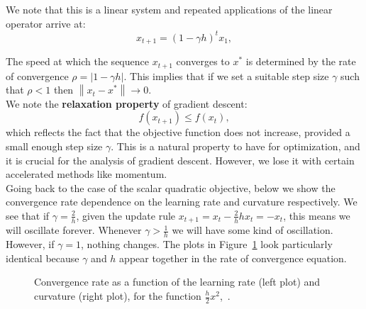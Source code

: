 \documentclass{article}
\newcommand\norm[1]{\left\lVert#1\right\rVert}
\begin{document}
We note that this is a linear system and repeated applications of the linear operator arrive at:
\begin{equation}
	x_{t+1} =(1 - \gamma h)^t x_1,
\end{equation}

The speed at which the sequence $x_{t+1}$ converges to $x^*$ is determined by the rate of convergence $\rho = |1 - \gamma h|$. This implies that if we set a suitable step size $\gamma$ such that $\rho < 1$ then $\norm{x_t - x^*} \rightarrow 0$.
\\

We note the \textbf{relaxation property} of gradient descent:
\begin{equation}
	f(x_{t+1}) \leq f(x_t),
\end{equation}
which reflects the fact that the objective function does not increase, provided a small enough step size $\gamma$. This is a natural property to have for optimization, and it is crucial for the analysis of gradient descent. However, we lose it with certain accelerated methods like momentum.
\\

Going back to the case of the scalar quadratic objective, below we show the convergence rate dependence on the learning rate and curvature respectively. 
We see that if $\gamma = \frac{2}{h}$, given the update rule $x_{t+1} = x_t - \frac{2}{h} h x_t = -x_t$, this means we will oscillate forever. Whenever $\gamma > \frac{1}{h}$ we will have some kind of oscillation. However, if $\gamma = 1$, nothing changes. The plots in Figure~\ref{fig:convergence-plots} look particularly identical because $\gamma$ and $h$ appear together in the rate of convergence equation.

\begin{figure}[H]%
\centering
{}%
\qquad
{}%
\caption{Convergence rate as a function of the learning rate (left plot) and curvature (right plot), for the function $\frac{h}{2}x^2$,~\cite{mitliagkas2019interesting}.}
\label{fig:convergence-plots}
\end{figure}
\end{document}
